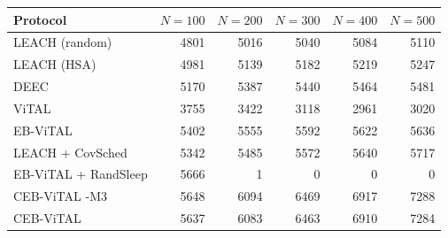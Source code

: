 \begin{tabular}{lrrrrr}
\hline
Protocol & $N=100$ & $N=200$ & $N=300$ & $N=400$ & $N=500$ \\
\hline
LEACH (random) & 4801 & 5016 & 5040 & 5084 & 5110 \\
LEACH (HSA) & 4981 & 5139 & 5182 & 5219 & 5247 \\
DEEC & 5170 & 5387 & 5440 & 5464 & 5481 \\
ViTAL & 3755 & 3422 & 3118 & 2961 & 3020 \\
EB-ViTAL & 5402 & 5555 & 5592 & 5622 & 5636 \\
LEACH + CovSched & 5342 & 5485 & 5572 & 5640 & 5717 \\
EB-ViTAL + RandSleep & 5666 & 1 & 0 & 0 & 0 \\
CEB-ViTAL -M3 & 5648 & 6094 & 6469 & 6917 & 7288 \\
CEB-ViTAL & 5637 & 6083 & 6463 & 6910 & 7284 \\
\hline
\end{tabular}
